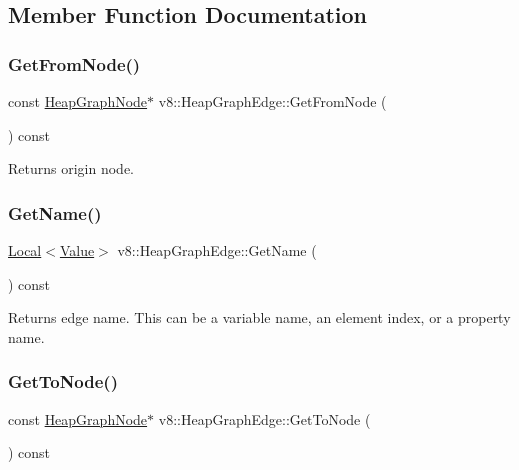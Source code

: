 \subsection{Member Function Documentation}
\mbox{\label{classv8_1_1HeapGraphEdge_a2d730f01c04209726ee3d35524e66113}} 
\subsubsection{\texorpdfstring{Get\+From\+Node()}{GetFromNode()}}
{\footnotesize\ttfamily const \mbox{\hyperlink{classv8_1_1HeapGraphNode}{Heap\+Graph\+Node}}$\ast$ v8\+::\+Heap\+Graph\+Edge\+::\+Get\+From\+Node (\begin{DoxyParamCaption}{ }\end{DoxyParamCaption}) const}

Returns origin node. \mbox{\label{classv8_1_1HeapGraphEdge_a05c82a383b42324b73506abc4c82f584}} 
\subsubsection{\texorpdfstring{Get\+Name()}{GetName()}}
{\footnotesize\ttfamily \mbox{\hyperlink{classv8_1_1Local}{Local}}$<$\mbox{\hyperlink{classv8_1_1Value}{Value}}$>$ v8\+::\+Heap\+Graph\+Edge\+::\+Get\+Name (\begin{DoxyParamCaption}{ }\end{DoxyParamCaption}) const}

Returns edge name. This can be a variable name, an element index, or a property name. \mbox{\label{classv8_1_1HeapGraphEdge_a7db892a422357ca83d9803b923e30452}} 
\subsubsection{\texorpdfstring{Get\+To\+Node()}{GetToNode()}}
{\footnotesize\ttfamily const \mbox{\hyperlink{classv8_1_1HeapGraphNode}{Heap\+Graph\+Node}}$\ast$ v8\+::\+Heap\+Graph\+Edge\+::\+Get\+To\+Node (\begin{DoxyParamCaption}{ }\end{DoxyParamCaption}) const}

